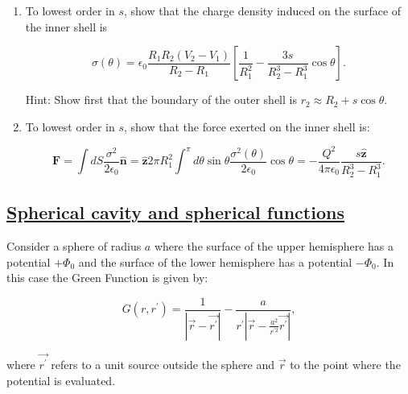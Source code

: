 \begin{enumerate}
	\item To lowest order in $s$, show that the charge density induced on the surface of the inner shell is

	\begin{equation}
		\sigma(\theta)=\epsilon_{0} \frac{R_{1} R_{2}\left(V_{2}-V_{1}\right)}{R_{2}-R_{1}}\left[\frac{1}{R_{1}^{2}}-\frac{3 s}{R_{2}^{3}-R_{1}^{3}} \cos \theta\right].
	\end{equation}

	Hint: Show first that the boundary of the outer shell is $r_{2} \approx R_{2}+s \cos \theta$.

	\item To lowest order in $s$, show that the force exerted on the inner shell is:
	
	\begin{equation}
		\mathbf{F}=\int d S \frac{\sigma^{2}}{2 \epsilon_{0}} \hat{\mathbf{n}}=\hat{\mathbf{z}} 2 \pi R_{1}^{2} \int^{\pi} d \theta \sin \theta \frac{\sigma^{2}(\theta)}{2 \epsilon_{0}} \cos \theta=-\frac{Q^{2}}{4 \pi \epsilon_{0}} \frac{s \hat{\mathbf{z}}}{R_{2}^{3}-R_{1}^{3}}.
	\end{equation}
\end{enumerate}

\subsection*{\hyperref[Spherical cavity and spherical functions]{Spherical cavity and spherical functions}}

Consider a sphere of radius $a$ where the surface of the upper hemisphere has a potential $+\Phi_{0}$ and the surface of the lower hemisphere has a potential $-\Phi_{0}$. In this case the Green Function is given by:

\begin{equation}
	G\left(r, r^{\prime}\right)=\frac{1}{\left|\vec{r}-\vec{r^{\prime}}\right|}-\frac{a}{r^{\prime}\left|\vec{r}-\frac{a^{2}}{r^{\prime 2}} \vec{r^{\prime}}\right|},
 \end{equation}

 where $\vec{r^{\prime}}$ refers to a unit source outside the sphere and $\vec{r}$ to the point where the potential is evaluated.

